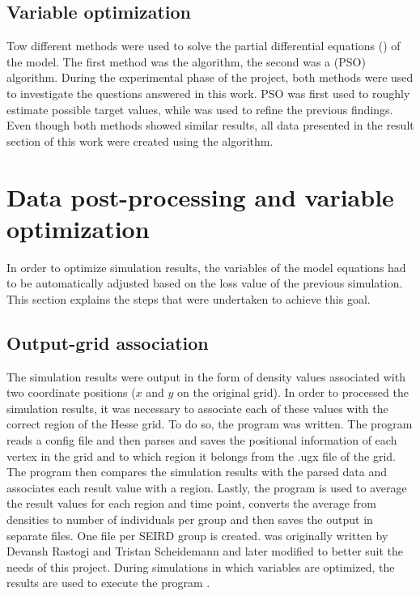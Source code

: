 \subsection{Variable optimization}
Tow different methods were used to solve the partial differential equations () of the model.
The first method was the  algorithm, the second was a  (PSO) algorithm.
During the experimental phase of the project, both methods were used to investigate the questions answered in this work.
PSO was first used to roughly estimate possible target values, while  was used to refine the previous findings.
Even though both methods showed similar results, all data presented in the result section of this work were created
using the  algorithm. 

\section{Data post-processing and variable optimization}
\label{sec:post_proc}
In order to optimize simulation results, the variables of the model equations had to be automatically adjusted based on
the loss value of the previous simulation. This section explains the steps that were undertaken to achieve this goal.

\subsection{Output-grid association}
The simulation results were output in the form of density values associated with two coordinate positions ($x$ and $y$ on the
original grid). In order to processed the simulation results, it was necessary to associate each of these
values with the correct region of the Hesse grid. To do so, the program  was written. The program reads a config file and
then parses and saves the positional information of each vertex in the grid and to which region it belongs from the .ugx file of the grid.
The program then compares the simulation results with the parsed data and associates each result value with a region. Lastly, the program 
is used to average the result values
for each region and time point, converts the average from densities to number of individuals per group and then saves the output in separate files.
One file per SEIRD group is created.  was originally written by Devansh Rastogi and Tristan Scheidemann and later modified to
better suit the needs of this project. During simulations in which variables are optimized, the results are used to execute the program .


